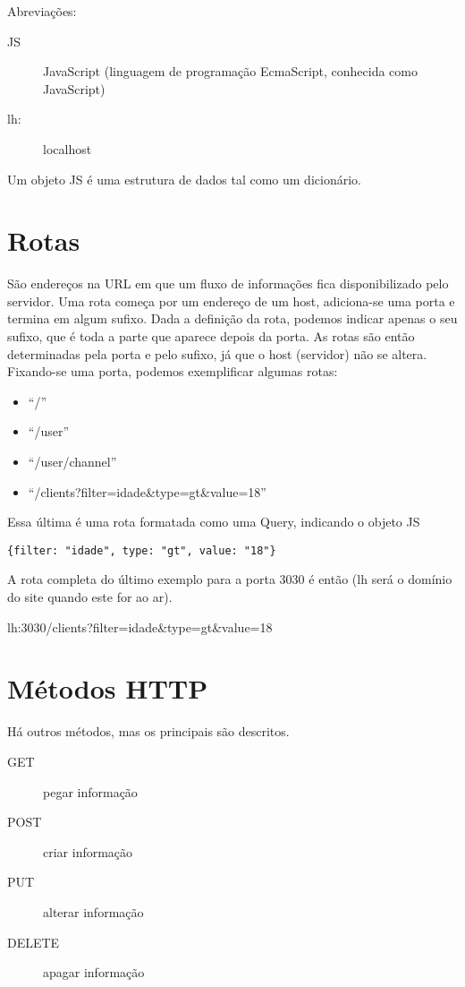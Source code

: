 \documentclass[12pt,a4paper]{article}
\begin{document}
\noindent Abreviações:
\begin{description}
\item[JS] JavaScript (linguagem de programação EcmaScript, conhecida como JavaScript)
\item[lh:] localhost
\end{description}
Um objeto JS é uma estrutura de dados tal como um dicionário.

\section{Rotas}
São endereços na URL em que um fluxo de informações fica disponibilizado pelo servidor. Uma rota começa por um endereço de um host, adiciona-se uma porta e termina em algum sufixo. Dada a definição da rota, podemos indicar apenas o seu sufixo, que é toda a parte que aparece depois da porta. As rotas são então determinadas pela porta e pelo sufixo, já que o host (servidor) não se altera. Fixando-se uma porta, podemos exemplificar algumas rotas: 
\begin{itemize}
\item ``/''
\item ``/user''
\item ``/user/channel''
\item ``/clients?filter=idade\&type=gt\&value=18''
\end{itemize}
Essa última é uma rota formatada como uma Query, indicando o objeto JS

\verb|{filter: "idade", type: "gt", value: "18"}|

A rota completa do último exemplo para a porta 3030 é então (lh será o domínio do site quando este for ao ar).

lh:3030/clients?filter=idade\&type=gt\&value=18
\section{Métodos HTTP}
Há outros métodos, mas os principais são descritos.
\begin{description}
\item[GET] pegar informação

\item[POST] criar informação

\item[PUT] alterar informação

\item[DELETE] apagar informação
\end{description}
\end{document}
